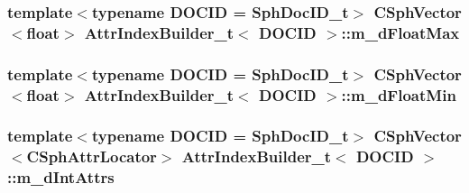 \hypertarget{classAttrIndexBuilder__t_ab351806adf13405734f13b951ffd9618}{
\subsubsection[{m\-\_\-d\-Float\-Max}]{\setlength{\rightskip}{0pt plus 5cm}template$<$typename D\-O\-C\-I\-D  = Sph\-Doc\-I\-D\-\_\-t$>$ {\bf C\-Sph\-Vector}$<${\bf float}$>$ {\bf Attr\-Index\-Builder\-\_\-t}$<$ D\-O\-C\-I\-D $>$\-::m\-\_\-d\-Float\-Max\hspace{0.3cm}{\ttfamily [private]}}}\label{classAttrIndexBuilder__t_ab351806adf13405734f13b951ffd9618}
\hypertarget{classAttrIndexBuilder__t_a89dc803219d68492d04aa0d6a1e28a2c}{
\subsubsection[{m\-\_\-d\-Float\-Min}]{\setlength{\rightskip}{0pt plus 5cm}template$<$typename D\-O\-C\-I\-D  = Sph\-Doc\-I\-D\-\_\-t$>$ {\bf C\-Sph\-Vector}$<${\bf float}$>$ {\bf Attr\-Index\-Builder\-\_\-t}$<$ D\-O\-C\-I\-D $>$\-::m\-\_\-d\-Float\-Min\hspace{0.3cm}{\ttfamily [private]}}}\label{classAttrIndexBuilder__t_a89dc803219d68492d04aa0d6a1e28a2c}
\hypertarget{classAttrIndexBuilder__t_af1d84506819b5d03c89c8e1fd1ac7eef}{
\subsubsection[{m\-\_\-d\-Int\-Attrs}]{\setlength{\rightskip}{0pt plus 5cm}template$<$typename D\-O\-C\-I\-D  = Sph\-Doc\-I\-D\-\_\-t$>$ {\bf C\-Sph\-Vector}$<${\bf C\-Sph\-Attr\-Locator}$>$ {\bf Attr\-Index\-Builder\-\_\-t}$<$ D\-O\-C\-I\-D $>$\-::m\-\_\-d\-Int\-Attrs\hspace{0.3cm}{\ttfamily [private]}}}\label{classAttrIndexBuilder__t_af1d84506819b5d03c89c8e1fd1ac7eef}
